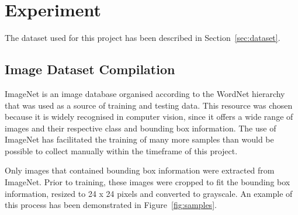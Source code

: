 \documentclass{llncs}
\begin{document}
	\section{Experiment} {
	\label{sec:experiment}




		The dataset used for this project has been described in Section~\ref{sec:dataset}.

		\subsection{Image Dataset Compilation} {
		\label{sec:dataset}

			ImageNet is an image database organised according to the WordNet hierarchy \citep{imagenet_cvpr09, fellbaum1998wordnet} that was used as a source of training and testing data. This resource was chosen because it is widely recognised in computer vision, since it offers a wide range of images and their respective class and bounding box information. The use of ImageNet has facilitated the training of many more samples than would be possible to collect manually within the timeframe of this project.


			Only images that contained bounding box information were extracted from ImageNet. Prior to training, these images were cropped to fit the bounding box information, resized to 24 x 24 pixels and converted to grayscale. An example of this process has been demonstrated in Figure~\ref{fig:samples}.


			\newcommand{\samplefigurewidth}{0.45\textwidth}
			\newcommand{\samplewidth}{0.14\textwidth}
			\newcommand{\sampleheight}{1.5cm}
			\newcommand{\includesample}[1]{\hspace{0.1cm}\texttt{[image: images/training/\#1]}}

}}
\end{document}
